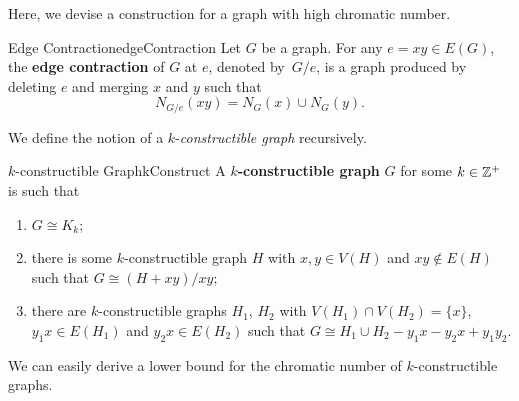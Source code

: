 \documentclass[math]{amznotes}
\theoremstyle{remark}
\newcommand{\0}{\mathbf{0}}
\newcommand{\1}{\mathbf{1}}
\begin{document}
Here, we devise a construction for a graph with high chromatic number.
\begin{dfnbox}{Edge Contraction}{edgeContraction}
    Let $G$ be a graph. For any $e = xy \in E(G)$, the {\color{red} \textbf{edge contraction}} of $G$ at $e$, denoted by~$G/e$, is a graph produced by deleting $e$ and merging $x$ and $y$ such that 
    \begin{equation*}
        N_{G/e}(xy) = N_G(x) \cup N_G(y).
    \end{equation*}
\end{dfnbox}
We define the notion of a $k$-\textit{constructible graph} recursively.
\begin{dfnbox}{$k$-constructible Graph}{kConstruct}
    A {\color{red} \textbf{$k$-constructible graph}} $G$ for some $k \in \mathbb{Z}^+$ is such that 
    \begin{enumerate}
        \item $G \cong K_k$;
        \item there is some $k$-constructible graph $H$ with $x, y \in V(H)$ and $xy \notin E(H)$ such that $G \cong (H + xy)/xy$;
        \item there are $k$-constructible graphs $H_1$, $H_2$ with $V(H_1) \cap V(H_2) = \{x\}$, $y_1x \in E(H_1)$ and $y_2x \in E(H_2)$ such that $G \cong H_1 \cup H_2 - y_1x - y_2x + y_1y_2$.
    \end{enumerate}
\end{dfnbox}
We can easily derive a lower bound for the chromatic number of $k$-constructible graphs.
\end{document}
